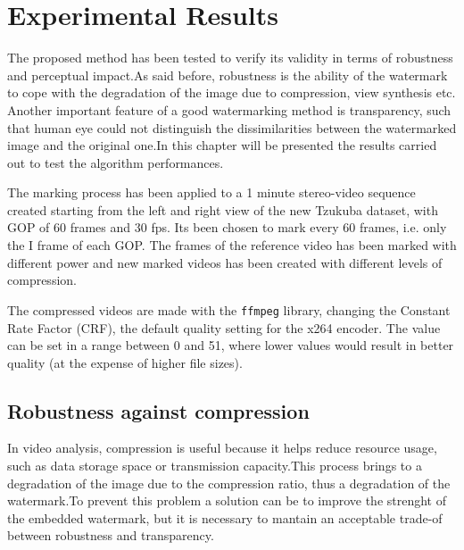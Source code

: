 \chapter{Experimental Results}
\label{exp}

The proposed method has been tested to verify its validity in terms of robustness and perceptual impact.\newline As said before, robustness is the ability of the watermark to cope with the degradation of the image due to compression, view synthesis etc.\newline 
Another important feature of a good watermarking method is transparency, such that human eye could not distinguish the dissimilarities between the watermarked image and the original one.\newline In this chapter will be presented the results carried out to test the algorithm performances.\newline

The marking process has been applied to a 1 minute stereo-video sequence created starting from the left and right view of the new Tzukuba dataset, with GOP of 60 frames and 30 fps.\newline 
Its been chosen to mark every 60 frames, i.e. only the I frame of each GOP.\newline 
The frames of the reference video has been marked with different power and new marked videos has been created with different levels of compression.\newline 

The compressed videos are made with the \texttt{ffmpeg} library, changing the Constant Rate Factor (CRF), the default quality setting for the x264 encoder. The value can be set in a range between 0 and 51, where lower values would result in better quality (at the expense of higher file sizes). 

\section{Robustness against compression}

In video analysis, compression is useful because it helps reduce resource usage, such as data storage space or transmission capacity.\newline  This process brings to a degradation of the image due to the compression ratio, thus a degradation of the watermark.\newline  To prevent this problem a solution can be to improve the strenght of the embedded watermark, but it is necessary to mantain an acceptable trade-of between robustness and transparency.\newline


